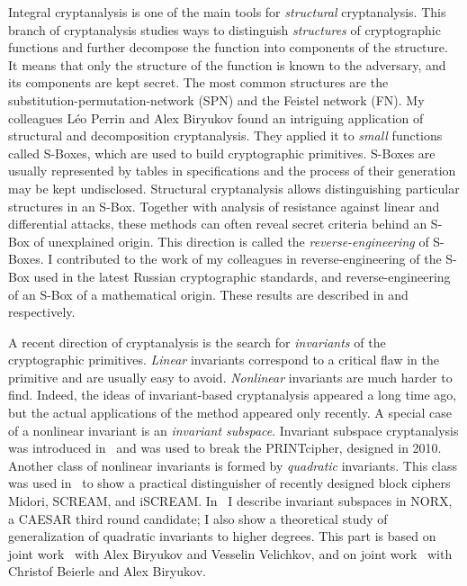 Integral cryptanalysis is one of the main tools for \emph{structural} cryptanalysis. This branch of cryptanalysis studies ways to distinguish \emph{structures} of cryptographic functions and further decompose the function into components of the structure. It means that only the structure of the function is known to the adversary, and its components are kept secret. The most common structures are the substitution-permutation-network (SPN) and the Feistel network (FN). My colleagues Léo Perrin and Alex Biryukov found an intriguing application of structural and decomposition cryptanalysis. They applied it to \emph{small} functions called S-Boxes, which are used to build cryptographic primitives. S-Boxes are usually represented by tables in specifications and the process of their generation may be kept undisclosed. Structural cryptanalysis allows distinguishing particular structures in an S-Box. Together with analysis of resistance against linear and differential attacks, these methods can often reveal secret criteria behind an S-Box of unexplained origin. This direction is called the \emph{reverse-engineering} of S-Boxes. I contributed to the work of my colleagues in reverse-engineering of the S-Box used in the latest Russian cryptographic standards, and reverse-engineering of an S-Box of a mathematical origin. These results are described in  and  respectively.

A recent direction of cryptanalysis is the search for \emph{invariants} of the cryptographic primitives. \emph{Linear} invariants correspond to a critical flaw in the primitive and are usually easy to avoid. \emph{Nonlinear} invariants are much harder to find. Indeed, the ideas of invariant-based cryptanalysis appeared a long time ago, but the actual applications of the method appeared only recently. A special case of a nonlinear invariant is an \emph{invariant subspace}. Invariant subspace cryptanalysis was introduced in~\cite{InvSpacePrint} and was used to break the PRINTcipher, designed in 2010. Another class of nonlinear invariants is formed by \emph{quadratic} invariants. This class was used in~\cite{NonlinInv} to show a practical distinguisher of recently designed block ciphers Midori, SCREAM, and iSCREAM. In~ I describe invariant subspaces in NORX, a CAESAR third round candidate; I also show a theoretical study of generalization of quadratic invariants to higher degrees. This part is based on joint work~\cite{OurNORX} with Alex Biryukov and Vesselin Velichkov, and on joint work~\cite{OurNLI} with Christof Beierle and Alex Biryukov.